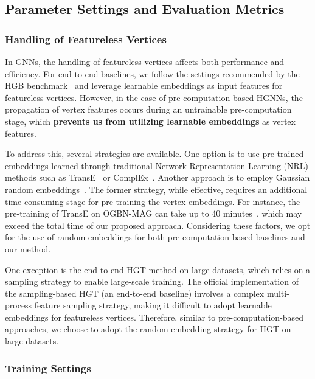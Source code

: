 \documentclass[lettersize,journal]{IEEEtran}
\begin{document}
\subsection{Parameter Settings and Evaluation Metrics}



\subsubsection{Handling of Featureless Vertices}\label{sec:param_setting_random_emb}
In GNNs, the handling of featureless vertices affects both performance and efficiency. 
For end-to-end baselines, we follow the settings recommended by the HGB benchmark~\cite{DBLP:conf/kdd/LvDLCFHZJDT21} and leverage learnable embeddings as input features for featureless vertices. 
However, in the case of pre-computation-based HGNNs, the propagation of vertex features occurs during an untrainable pre-computation stage, which \textbf{prevents us from utilizing learnable embeddings} as vertex features.



To address this, several strategies are available. 
One option is to use pre-trained embeddings learned through traditional Network Representation Learning (NRL) methods such as TransE~\cite{DBLP:conf/nips/BordesUGWY13,yu2020scalable} or ComplEx~\cite{DBLP:conf/icml/TrouillonWRGB16,yang2022simple}. 
Another approach is to employ Gaussian random embeddings~\cite{yang2022simple}. 
The former strategy, while effective, requires an additional time-consuming stage for pre-training the vertex embeddings. 
For instance, the pre-training of TransE on OGBN-MAG can take up to 40 minutes~\cite{yu2020scalable}, which may exceed the total time of our proposed approach. 
Considering these factors, we opt for the use of random embeddings for both pre-computation-based baselines and our method.


One exception is the end-to-end HGT method on large datasets, which relies on a sampling strategy to enable large-scale training. 
The official implementation of the sampling-based HGT (an end-to-end baseline) involves a complex multi-process feature sampling strategy, making it difficult to adopt learnable embeddings for featureless vertices. 
Therefore, similar to pre-computation-based approaches, we choose to adopt the random embedding strategy for HGT on large datasets.





\subsubsection{Training Settings}
\end{document}
